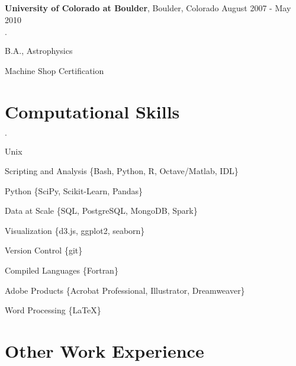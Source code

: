 \documentclass[margin,line]{res}
\newenvironment{list2}{
  \begin{list}{$\cdot$}{%
      \setlength{\itemsep}{0in}
      \setlength{\parsep}{0in} \setlength{\parskip}{0in}
      \setlength{\topsep}{0in} \setlength{\partopsep}{0in} 
      \setlength{\leftmargin}{0.2in}}}{\end{list}}
\newenvironment{list3}{
  \begin{list}{$\cdot$}{%
      \setlength{\itemsep}{0in}
      \setlength{\parsep}{0in} \setlength{\parskip}{0in}
      \setlength{\topsep}{0in} \setlength{\partopsep}{0in} 
      \setlength{\leftmargin}{0.1in}}}{\end{list}}
\begin{document}
\begin{resume}
{\bf University of Colorado at Boulder}, Boulder, Colorado \hfill {August 2007 - May 2010}\\
\vspace*{-.15in}
\begin{list2}
\item B.A., Astrophysics
\item Machine Shop Certification
\end{list2}




\section{\sc Computational Skills}

\begin{list3}
\item Unix
\item Scripting and Analysis \{Bash, Python, R, Octave/Matlab, IDL\}
\item Python \{SciPy, Scikit-Learn, Pandas\}
\item Data at Scale \{SQL, PostgreSQL, MongoDB, Spark\}
\item Visualization \{d3.js, ggplot2, seaborn\}
\item Version Control \{git\}
\item Compiled Languages \{Fortran\}
\item Adobe Products \{Acrobat Professional, Illustrator, Dreamweaver\}
\item Word Processing \{\LaTeX\}
\end{list3}

\section{\sc Other Work Experience}


\end{resume}
\end{document}
